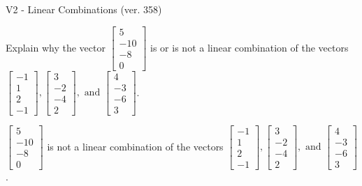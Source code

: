 \begin{exercise}
  \begin{exerciseTitle}V2 - Linear Combinations (ver. 358)\end{exerciseTitle}
  \begin{exerciseStatement}
    Explain why the vector \(\left[\begin{array}{c}
5 \\
-10 \\
-8 \\
0
\end{array}\right]\)  is or is not a linear 
	combination of the vectors \(\left[\begin{array}{c}
-1 \\
1 \\
2 \\
-1
\end{array}\right] , \left[\begin{array}{c}
3 \\
-2 \\
-4 \\
2
\end{array}\right] , \text{ and } \left[\begin{array}{c}
4 \\
-3 \\
-6 \\
3
\end{array}\right]\).
	


  \end{exerciseStatement}
  \begin{exerciseAnswer}
   \(\left[\begin{array}{c}
5 \\
-10 \\
-8 \\
0
\end{array}\right]\) 
  	 is not  
	a linear combination of the vectors \(\left[\begin{array}{c}
-1 \\
1 \\
2 \\
-1
\end{array}\right] , \left[\begin{array}{c}
3 \\
-2 \\
-4 \\
2
\end{array}\right] , \text{ and } \left[\begin{array}{c}
4 \\
-3 \\
-6 \\
3
\end{array}\right]\).

	
  


  \end{exerciseAnswer}
\end{exercise}